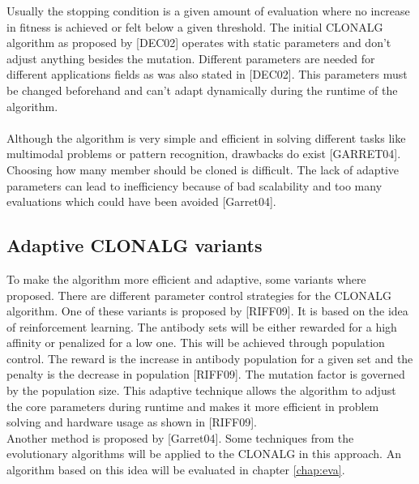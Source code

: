 Usually the stopping condition is a given amount of evaluation where no increase in fitness is achieved or felt below a given threshold. The initial CLONALG algorithm as proposed by [DEC02] operates with static parameters and don't adjust anything besides the mutation. Different parameters are needed for different applications fields as was also stated in [DEC02]. This parameters must be changed beforehand and can't adapt dynamically during the runtime of the algorithm.\\\\
Although the algorithm is very simple and efficient in solving different tasks like multimodal problems or pattern recognition, drawbacks do exist [GARRET04]. Choosing how many member should be cloned is difficult. The lack of adaptive parameters can lead to inefficiency because of bad scalability and too many evaluations which could have been avoided [Garret04].
\subsection{Adaptive CLONALG variants}
To make the algorithm more efficient and adaptive, some variants where proposed. There are different parameter control strategies for the CLONALG algorithm. One of these variants is proposed by [RIFF09]. It is based on the idea of reinforcement learning. The antibody sets will be either rewarded for a high affinity or penalized for a low one. This will be achieved through population control. The reward is the increase in antibody population for a given set and the penalty is the decrease in population [RIFF09]. The mutation factor is governed by the population size. This adaptive technique allows the algorithm to adjust the core parameters during runtime and makes it more efficient in problem solving and hardware usage as shown in [RIFF09].\\
Another method is proposed by [Garret04]. Some techniques from the evolutionary algorithms will be applied to the CLONALG in this approach. An algorithm based on this idea will be evaluated in chapter \ref{chap:eva}.
 




